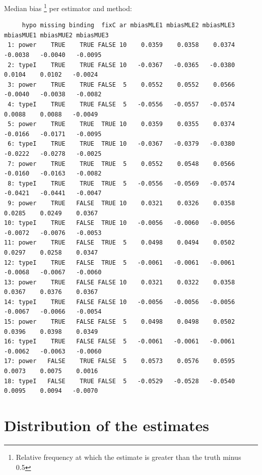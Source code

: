 \documentclass[12pt]{article}
\begin{document}
Median bias \footnote{Relative frequency at which the estimate is greater than the truth minus 0.5} per estimator and method:
\begin{adjustwidth}{-1cm}{-1cm}
\begin{verbatim}
     hypo missing binding  fixC ar mbiasMLE1 mbiasMLE2 mbiasMLE3 mbiasMUE1 mbiasMUE2 mbiasMUE3
 1: power    TRUE    TRUE FALSE 10    0.0359    0.0358    0.0374   -0.0038   -0.0040   -0.0095
 2: typeI    TRUE    TRUE FALSE 10   -0.0367   -0.0365   -0.0380    0.0104    0.0102   -0.0024
 3: power    TRUE    TRUE FALSE  5    0.0552    0.0552    0.0566   -0.0040   -0.0038   -0.0082
 4: typeI    TRUE    TRUE FALSE  5   -0.0556   -0.0557   -0.0574    0.0088    0.0088   -0.0049
 5: power    TRUE    TRUE  TRUE 10    0.0359    0.0355    0.0374   -0.0166   -0.0171   -0.0095
 6: typeI    TRUE    TRUE  TRUE 10   -0.0367   -0.0379   -0.0380   -0.0222   -0.0278   -0.0025
 7: power    TRUE    TRUE  TRUE  5    0.0552    0.0548    0.0566   -0.0160   -0.0163   -0.0082
 8: typeI    TRUE    TRUE  TRUE  5   -0.0556   -0.0569   -0.0574   -0.0421   -0.0441   -0.0047
 9: power    TRUE   FALSE  TRUE 10    0.0321    0.0326    0.0358    0.0285    0.0249    0.0367
10: typeI    TRUE   FALSE  TRUE 10   -0.0056   -0.0060   -0.0056   -0.0072   -0.0076   -0.0053
11: power    TRUE   FALSE  TRUE  5    0.0498    0.0494    0.0502    0.0297    0.0258    0.0347
12: typeI    TRUE   FALSE  TRUE  5   -0.0061   -0.0061   -0.0061   -0.0068   -0.0067   -0.0060
13: power    TRUE   FALSE FALSE 10    0.0321    0.0322    0.0358    0.0367    0.0376    0.0367
14: typeI    TRUE   FALSE FALSE 10   -0.0056   -0.0056   -0.0056   -0.0067   -0.0066   -0.0054
15: power    TRUE   FALSE FALSE  5    0.0498    0.0498    0.0502    0.0396    0.0398    0.0349
16: typeI    TRUE   FALSE FALSE  5   -0.0061   -0.0061   -0.0061   -0.0062   -0.0063   -0.0060
17: power   FALSE    TRUE FALSE  5    0.0573    0.0576    0.0595    0.0073    0.0075    0.0016
18: typeI   FALSE    TRUE FALSE  5   -0.0529   -0.0528   -0.0540    0.0095    0.0094   -0.0070
\end{verbatim}

\end{adjustwidth}

\clearpage

\section{Distribution of the estimates}
\label{sec:orgd74ff69}
\end{document}
